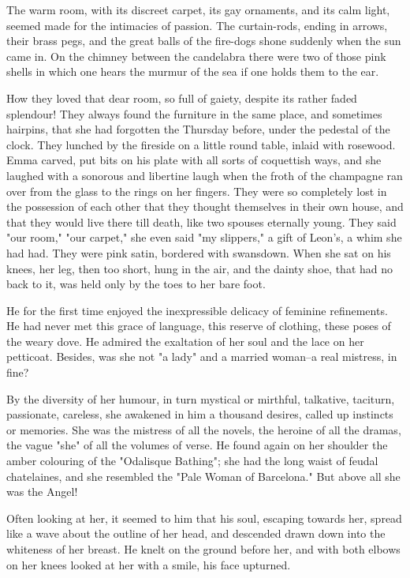 \documentclass{tufte-book}
\begin{document}
The warm room, with its discreet carpet, its gay ornaments, and its
calm light, seemed made for the intimacies of passion. The curtain-rods,
ending in arrows, their brass pegs, and the great balls of the fire-dogs
shone suddenly when the sun came in. On the chimney between the
candelabra there were two of those pink shells in which one hears the
murmur of the sea if one holds them to the ear.

How they loved that dear room, so full of gaiety, despite its rather
faded splendour! They always found the furniture in the same place, and
sometimes hairpins, that she had forgotten the Thursday before, under
the pedestal of the clock. They lunched by the fireside on a little
round table, inlaid with rosewood. Emma carved, put bits on his plate
with all sorts of coquettish ways, and she laughed with a sonorous and
libertine laugh when the froth of the champagne ran over from the
glass to the rings on her fingers. They were so completely lost in
the possession of each other that they thought themselves in their
own house, and that they would live there till death, like two spouses
eternally young. They said "our room," "our carpet," she even said "my
slippers," a gift of Leon's, a whim she had had. They were pink satin,
bordered with swansdown. When she sat on his knees, her leg, then too
short, hung in the air, and the dainty shoe, that had no back to it, was
held only by the toes to her bare foot.

He for the first time enjoyed the inexpressible delicacy of feminine
refinements. He had never met this grace of language, this reserve of
clothing, these poses of the weary dove. He admired the exaltation of
her soul and the lace on her petticoat. Besides, was she not "a lady"
and a married woman--a real mistress, in fine?

By the diversity of her humour, in turn mystical or mirthful, talkative,
taciturn, passionate, careless, she awakened in him a thousand desires,
called up instincts or memories. She was the mistress of all the novels,
the heroine of all the dramas, the vague "she" of all the volumes
of verse. He found again on her shoulder the amber colouring of the
"Odalisque Bathing"; she had the long waist of feudal chatelaines, and
she resembled the "Pale Woman of Barcelona." But above all she was the
Angel!

Often looking at her, it seemed to him that his soul, escaping towards
her, spread like a wave about the outline of her head, and descended
drawn down into the whiteness of her breast. He knelt on the ground
before her, and with both elbows on her knees looked at her with a
smile, his face upturned.
\end{document}
